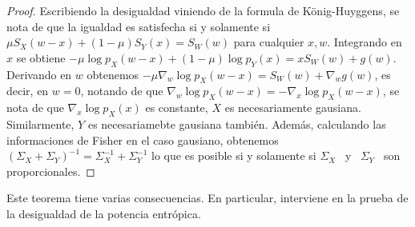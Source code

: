 \begin{proof}
  Escribiendo la desigualdad viniendo de la formula de K\"onig-Huyggens, se nota
  de que  la igualdad es  satisfecha si y  solamente si $\mu S_X(w-x)  + (1-\mu)
  S_Y(x) =  S_W(w)$ para cualquier  $x, w$. Integrando  en $x$ se  obtiene $-\mu
  \log  p_X(w-x) + (1-\mu)  \log p_Y(x)  = x  S_W(w) +  g(w)$. Derivando  en $w$
  obtenemos $-\mu \nabla_w \log p_X(w-x) = S_W(w) + \nabla_w g(w)$, es decir, en
  $w = 0$, notando de que $\nabla_w \log p_X(w-x) = -\nabla_x \log p_X(w-x)$, se
  nota de  que $\nabla_x  \log p_X(x)$ es  constante, \ie $X$  es necesariamente
  gausiana.  Similarmente, $Y$ es  necesariamebte gausiana  tambi\'en. Adem\'as,
  calculando las informaciones de Fisher  en el caso gausiano, obtenemos $\left(
    \Sigma_X + \Sigma_Y \right)^{-1} =  \Sigma_X^{-1} + \Sigma_Y^{-1}$ lo que es
  posible si y solamente si $\Sigma_X$ \ y \ $\Sigma_Y$ \ son proporcionales.
\end{proof}
%
Este teorema tiene varias consecuencias.  En particular, interviene en la prueba
de la desigualdad de la potencia entr\'opica.

\

